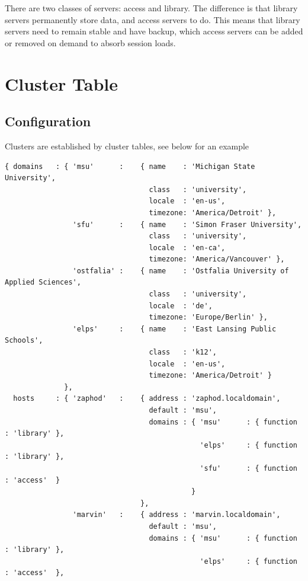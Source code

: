 There are two classes of servers: access and library. The difference is that library servers permanently store data, and access servers to do. This means that library servers need to remain stable and have backup, which access servers can be added or removed on demand to absorb session loads.
\section{Cluster Table}
\subsection{Configuration}
Clusters are established by cluster tables, see below for an example
\begin{verbatim}
{ domains   : { 'msu'      :    { name    : 'Michigan State University',
                                  class   : 'university',
                                  locale  : 'en-us', 
                                  timezone: 'America/Detroit' },
                'sfu'      :    { name    : 'Simon Fraser University',
                                  class   : 'university',
                                  locale  : 'en-ca',
                                  timezone: 'America/Vancouver' },
                'ostfalia' :    { name    : 'Ostfalia University of Applied Sciences',
                                  class   : 'university',
                                  locale  : 'de',
                                  timezone: 'Europe/Berlin' },
                'elps'     :    { name    : 'East Lansing Public Schools',
                                  class   : 'k12',
                                  locale  : 'en-us',
                                  timezone: 'America/Detroit' }
              },
  hosts     : { 'zaphod'   :    { address : 'zaphod.localdomain',
                                  default : 'msu',
                                  domains : { 'msu'      : { function : 'library' },
                                              'elps'     : { function : 'library' },
                                              'sfu'      : { function : 'access'  }
                                            }
                                },
                'marvin'   :    { address : 'marvin.localdomain',
                                  default : 'msu',
                                  domains : { 'msu'      : { function : 'library' },
                                              'elps'     : { function : 'access'  },

\end{verbatim}
